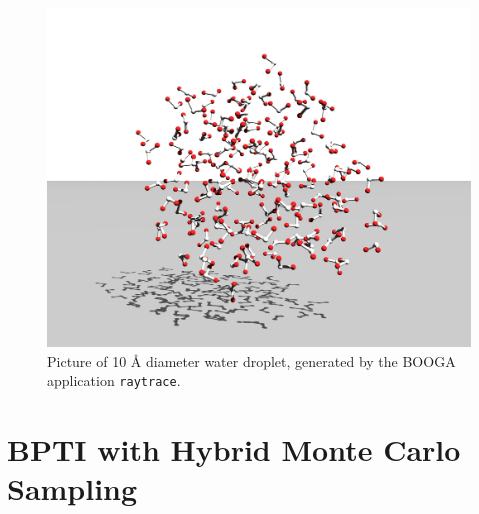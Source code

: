 \documentclass[11pt]{report}
\providecommand{\ttsmall}[1]{\texttt{\small\mbox{#1}}}
\begin{document}
\begin{figure}[htb]
   \centerline{\includegraphics[width=12cm]{water_423.jpg}}
    \caption{Picture of 10 \AA{ }diameter water droplet, generated by the BOOGA application \ttsmall{raytrace}.  \label{fig:water423}}
\end{figure}



\section{BPTI with Hybrid Monte Carlo Sampling}
\end{document}
